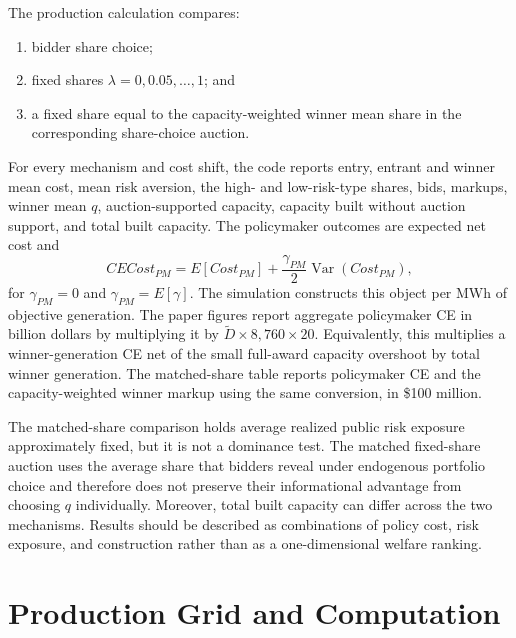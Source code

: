 \documentclass[10pt]{article}
\begin{document}
The production calculation compares:
\begin{enumerate}[leftmargin=2em]
\item bidder share choice;
\item fixed shares $\lambda=0,0.05,\ldots,1$; and
\item a fixed share equal to the capacity-weighted winner mean share in the
corresponding share-choice auction.
\end{enumerate}
For every mechanism and cost shift, the code reports entry, entrant and winner
mean cost, mean risk aversion, the high- and low-risk-type shares, bids, markups, winner
mean $q$, auction-supported capacity, capacity built without auction support, and total built
capacity.  The policymaker outcomes are expected net cost and
\begin{equation}
CECost_{PM}=E[Cost_{PM}]
+\frac{\gamma_{PM}}{2}\operatorname{Var}(Cost_{PM}),
\end{equation}
for $\gamma_{PM}=0$ and $\gamma_{PM}=E[\gamma]$.
The simulation constructs this object per MWh of objective generation.  The
paper figures report aggregate policymaker CE in billion dollars by multiplying
it by $\widetilde D\times 8{,}760\times20$.  Equivalently, this multiplies a
winner-generation CE net of the small full-award capacity overshoot by total
winner generation.  The matched-share table reports policymaker CE and the
capacity-weighted winner markup using the same conversion, in \$100 million.

The matched-share comparison holds average realized public risk exposure
approximately fixed, but it is not a dominance test.  The matched fixed-share
auction uses the average share that bidders reveal under endogenous portfolio
choice and therefore does not preserve their informational advantage from
choosing $q$ individually.  Moreover, total built capacity can differ across
the two mechanisms.  Results should be described as combinations of policy
cost, risk exposure, and construction rather than as a one-dimensional welfare
ranking.

\section{Production Grid and Computation}
\end{document}
